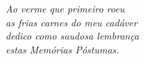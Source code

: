 \begin{dedicatoria}
   \vspace*{\fill}
   \centering
   \noindent
   \textit{Ao verme que primeiro roeu\\
   as frias carnes do meu cadáver\\
   dedico como saudosa lembrança\\
   estas Memórias Póstumas.} \vspace*{\fill}
\end{dedicatoria}